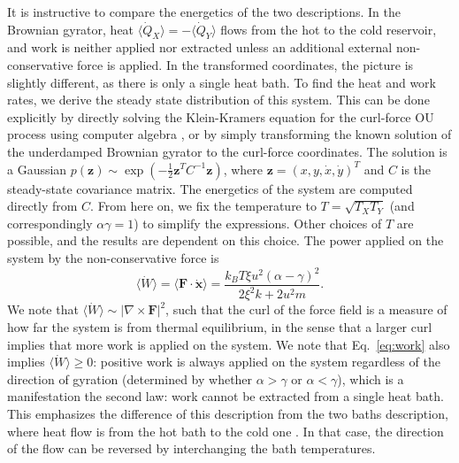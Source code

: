 It is instructive to compare the energetics of the two descriptions. In the Brownian gyrator, heat $\langle \dot{Q}_X \rangle = -\langle \dot{Q}_Y \rangle$ flows from the hot to the cold reservoir, and work is neither applied nor extracted unless an additional external non-conservative force is applied. In the transformed coordinates, the picture is slightly different, as there is only a single heat bath. To find the heat and work rates, we derive the steady state distribution of this system. This can be done explicitly by directly solving the Klein-Kramers equation for the curl-force OU process \cite{risken1996fokker} using computer algebra \cite{gowda2021high}, or by simply transforming the known solution of the underdamped Brownian gyrator \cite{mancois2018two, bae2021inertial} to the curl-force coordinates. The solution is a Gaussian $p(\mathbf{z}) \sim \exp(-\frac{1}{2}\mathbf{z}^T C^{-1} \mathbf{z})$, where $\mathbf{z} = (x, y, \dot{x}, \dot{y})^T$ and $C$ is the steady-state covariance matrix. The energetics of the system are computed directly from $C$. From here on, we fix the temperature to $T=\sqrt{T_X T_Y}$ (and correspondingly $\alpha\gamma=1$) to simplify the expressions. Other choices of $T$ are possible, and the results are dependent on this choice. The power applied on the system by the non-conservative force is
\begin{equation}\label{eq:work}
    \langle \dot{W} \rangle = \langle \mathbf{F} \cdot \dot{\mathbf{x}} \rangle = 
\frac{k_B T\xi u^2(\alpha-\gamma)^2 }{2  \xi^{2}  k + 2  u^{2}  m }.
\end{equation}
We note that $\langle \dot{W}\rangle \sim |\nabla \times \mathbf{F}|^2$, such that the curl of the force field is a measure of how far the system is from thermal equilibrium, in the sense that a larger curl implies that more work is applied on the system. 
We note that Eq.~\ref{eq:work} also implies $\langle \dot{W}\rangle\geq0$: positive work is always applied on the system regardless of the direction of gyration (determined by whether $\alpha > \gamma$ or $\alpha < \gamma$), which is a manifestation the second law: work cannot be extracted from a single heat bath. This emphasizes the difference of this description from the two baths description, where heat flow is from the hot bath to the cold one \cite{bae2021inertial}. In that case, the direction of the flow can be reversed by interchanging the bath temperatures.

